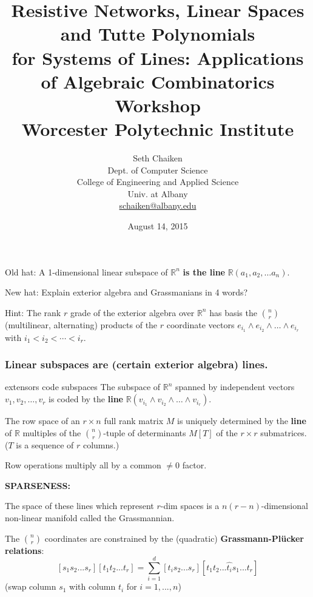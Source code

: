 \documentclass{beamer}
\title{
Resistive Networks, Linear Spaces and Tutte Polynomials\\
for Systems of Lines: Applications of Algebraic Combinatorics Workshop\\
Worcester Polytechnic Institute}
\author{Seth Chaiken\\
Dept. of Computer Science\\
College of Engineering and Applied Science\\
Univ. at Albany\\
\url{schaiken@albany.edu}
}
\date{August 14, 2015}
\newcommand{\Reals}{\ensuremath{\mathbb{R}}}
\begin{document}
\begin{frame}
 \titlepage
\end{frame}




\begin{frame}
Old hat: A 1-dimensional linear subspace of $\Reals^n$ \textbf{is the line} 
$\Reals (a_1, a_2, \ldots a_n)$.

New hat: Explain exterior algebra and Grassmanians in 4 words?


Hint:  The rank $r$ grade of the exterior algebra over $\Reals^n$ has 
basis the $\binom{n}{r}$ (multilinear, alternating) products
of the $r$ coordinate vectors $e_{i_1}\wedge e_{i_2}\wedge \ldots \wedge e_{i_r}$
with $i_1<i_2<\cdots < i_r$.

\end{frame}

\begin{frame}
\frametitle{Linear subspaces are (certain exterior algebra) lines.}

\begin{block}{extensors code subspaces}
The subspace of $\Reals^n$ spanned by independent vectors 
$v_1, v_2, \ldots, v_r$ is coded by the \textbf{line}
$\Reals(v_{i_1}\wedge v_{i_2}\wedge \ldots \wedge v_{i_r})$.
\end{block}

The row space of an $r \times n$ full rank matrix $M$ is uniquely determined by
the \textbf{line} of $\Reals$ multiples of the 
$\binom{n}{r}$-tuple of determinants $M[T]$ 
of the $r\times r$ submatrices.\\
($T$ is a sequence of $r$ columns.)

Row operations multiply all by a common $\neq 0$ factor.

\textbf{SPARSENESS:}

The space of these lines which represent $r$-dim spaces is a
$n(r-n)$-dimensional non-linear manifold called the Grassmannian.

The $\binom{n}{r}$ coordinates are constrained by the (quadratic)
\textbf{Grassmann-Pl\"{u}cker relations}:
\[
[s_1 s_2 ... s_r][t_1 t_2 ... t_r] = 
\sum_{i=1}^d [t_i s_2 ... s_r][t_1 t_2 ... \hat{t_i} s_1 ... t_r]
\]
(swap column $s_1$ with column $t_i$ for $i=1, ..., n$)


\end{frame}
  
\end{document}
